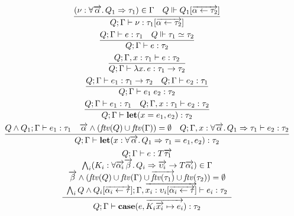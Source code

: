 \begin{gather*}
  \infer{Q; \Gamma \vdash \nu: \tau_1[\overrightarrow{\alpha \assign \tau_2}]}{
    (\nu: \forall \overrightarrow{\alpha}\ldotp Q_1 \Rightarrow \tau_1) \in \Gamma
    &
    Q \Vdash Q_1[\overrightarrow{\alpha \assign \tau_2}]
  }
  \\
  \infer{Q; \Gamma \vdash e: \tau_2}{
    Q; \Gamma \vdash e: \tau_1
    &
    Q \Vdash \tau_1 \simeq \tau_2
  }
  \\
  \infer{Q; \Gamma \vdash \lambda x\ldotp e: \tau_1 \to \tau_2}{
    Q; \Gamma, x: \tau_1 \vdash e: \tau_2
  }
  \\
  \infer{Q; \Gamma \vdash e_1\; e_2: \tau_2}{
    Q; \Gamma \vdash e_1: \tau_1 \to \tau_2
    &
    Q; \Gamma \vdash e_2: \tau_1
  }
  \\
  \infer{Q; \Gamma \vdash \mathbf{let}(x = e_1, e_2): \tau_2}{
    Q; \Gamma \vdash e_1: \tau_1
    &
    Q; \Gamma, x: \tau_1 \vdash e_2: \tau_2
  }
  \\
  \infer{Q; \Gamma \vdash \mathbf{let}(x: \forall \overrightarrow{\alpha}\ldotp Q_1 \Rightarrow \tau_1 = e_1, e_2): \tau_2}{
    Q \land Q_1; \Gamma \vdash e_1: \tau_1
    &
    \overrightarrow{\alpha} \land (\mathit{ftv}(Q) \cup \mathit{ftv}(\Gamma)) = \emptyset
    &
    Q; \Gamma, x: \forall \overrightarrow{\alpha}\ldotp Q_1 \Rightarrow \tau_1 \vdash e_2: \tau_2
  }
  \\
  \infer{Q; \Gamma \vdash \mathbf{case}(e, \overrightarrow{K_i \overrightarrow{x_i} \mapsto e_i}): \tau_2}{
    \begin{array}{c}
      Q; \Gamma \vdash e: T \overrightarrow{\tau_1}
      \\
      \bigwedge_i (K_i: \forall \overrightarrow{\alpha_i}\overrightarrow{\beta}\ldotp Q_i \Rightarrow \overrightarrow{\upsilon_i} \to T \overrightarrow{\alpha_i}) \in \Gamma
      \\
      \overrightarrow{\beta} \land (\mathit{ftv}(Q) \cup \mathit{ftv}(\Gamma) \cup \overrightarrow{\mathit{ftv}(\tau_1)} \cup \mathit{ftv}(\tau_2)) = \emptyset
      \\
      \bigwedge_i Q \land Q_i[\overrightarrow{\alpha_i \assign \tau}]; \Gamma, \overrightarrow{x_i: \upsilon_i[\overrightarrow{\alpha_i \assign \tau}]} \vdash e_i: \tau_2
    \end{array}
  }
\end{gather*}


